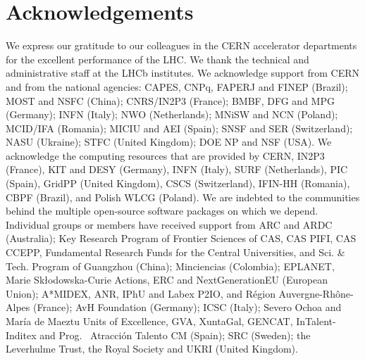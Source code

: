 \section*{Acknowledgements}
%
%
\noindent We express our gratitude to our colleagues in the CERN
accelerator departments for the excellent performance of the LHC. We
thank the technical and administrative staff at the LHCb
institutes.
We acknowledge support from CERN and from the national agencies:
CAPES, CNPq, FAPERJ and FINEP (Brazil); 
MOST and NSFC (China); 
CNRS/IN2P3 (France); 
BMBF, DFG and MPG (Germany); 
INFN (Italy); 
NWO (Netherlands); 
MNiSW and NCN (Poland); 
MCID/IFA (Romania); 
MICIU and AEI (Spain);
SNSF and SER (Switzerland); 
NASU (Ukraine); 
STFC (United Kingdom); 
DOE NP and NSF (USA).
We acknowledge the computing resources that are provided by CERN, IN2P3
(France), KIT and DESY (Germany), INFN (Italy), SURF (Netherlands),
PIC (Spain), GridPP (United Kingdom), 
CSCS (Switzerland), IFIN-HH (Romania), CBPF (Brazil),
and Polish WLCG (Poland).
We are indebted to the communities behind the multiple open-source
software packages on which we depend.
Individual groups or members have received support from
ARC and ARDC (Australia);
Key Research Program of Frontier Sciences of CAS, CAS PIFI, CAS CCEPP, 
Fundamental Research Funds for the Central Universities, 
and Sci. \& Tech. Program of Guangzhou (China);
Minciencias (Colombia);
EPLANET, Marie Sk\l{}odowska-Curie Actions, ERC and NextGenerationEU (European Union);
A*MIDEX, ANR, IPhU and Labex P2IO, and R\'{e}gion Auvergne-Rh\^{o}ne-Alpes (France);
AvH Foundation (Germany);
ICSC (Italy); 
Severo Ochoa and Mar\'ia de Maeztu Units of Excellence, GVA, XuntaGal, GENCAT, InTalent-Inditex and Prog. ~Atracci\'on Talento CM (Spain);
SRC (Sweden);
the Leverhulme Trust, the Royal Society
 and UKRI (United Kingdom).

